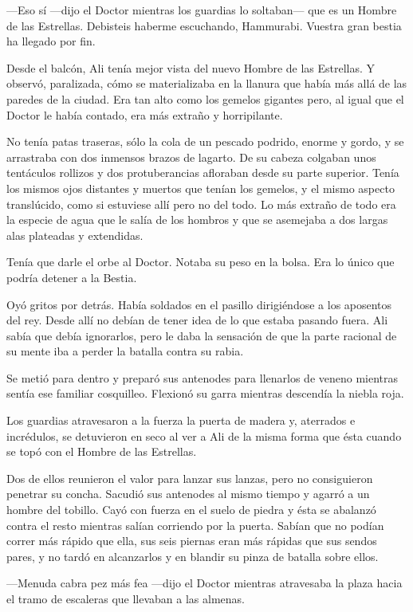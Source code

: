 ---Eso sí ---dijo el Doctor mientras los guardias lo soltaban--- que es
un Hombre de las Estrellas. Debisteis haberme escuchando, Hammurabi.
Vuestra gran bestia ha llegado por fin.

Desde el balcón, Ali tenía mejor vista del nuevo Hombre de las
Estrellas. Y observó, paralizada, cómo se materializaba en la llanura
que había más allá de las paredes de la ciudad. Era tan alto como los
gemelos gigantes pero, al igual que el Doctor le había contado, era más
extraño y horripilante.

No tenía patas traseras, sólo la cola de un pescado podrido, enorme y
gordo, y se arrastraba con dos inmensos brazos de lagarto. De su cabeza
colgaban unos tentáculos rollizos y dos protuberancias afloraban desde
su parte superior. Tenía los mismos ojos distantes y muertos que tenían
los gemelos, y el mismo aspecto translúcido, como si estuviese allí pero
no del todo. Lo más extraño de todo era la especie de agua que le salía
de los hombros y que se asemejaba a dos largas alas plateadas y
extendidas.

Tenía que darle el orbe al Doctor. Notaba su peso en la bolsa. Era lo
único que podría detener a la Bestia.

Oyó gritos por detrás. Había soldados en el pasillo dirigiéndose a los
aposentos del rey. Desde allí no debían de tener idea de lo que estaba
pasando fuera. Ali sabía que debía ignorarlos, pero le daba la sensación
de que la parte racional de su mente iba a perder la batalla contra su
rabia.

Se metió para dentro y preparó sus antenodes para llenarlos de veneno
mientras sentía ese familiar cosquilleo. Flexionó su garra mientras
descendía la niebla roja.

Los guardias atravesaron a la fuerza la puerta de madera y, aterrados e
incrédulos, se detuvieron en seco al ver a Ali de la misma forma que
ésta cuando se topó con el Hombre de las Estrellas.

Dos de ellos reunieron el valor para lanzar sus lanzas, pero no
consiguieron penetrar su concha. Sacudió sus antenodes al mismo tiempo y
agarró a un hombre del tobillo. Cayó con fuerza en el suelo de piedra y
ésta se abalanzó contra el resto mientras salían corriendo por la
puerta. Sabían que no podían correr más rápido que ella, sus seis
piernas eran más rápidas que sus sendos pares, y no tardó en alcanzarlos
y en blandir su pinza de batalla sobre ellos.

---Menuda cabra pez más fea ---dijo el Doctor mientras atravesaba la
plaza hacia el tramo de escaleras que llevaban a las almenas.

